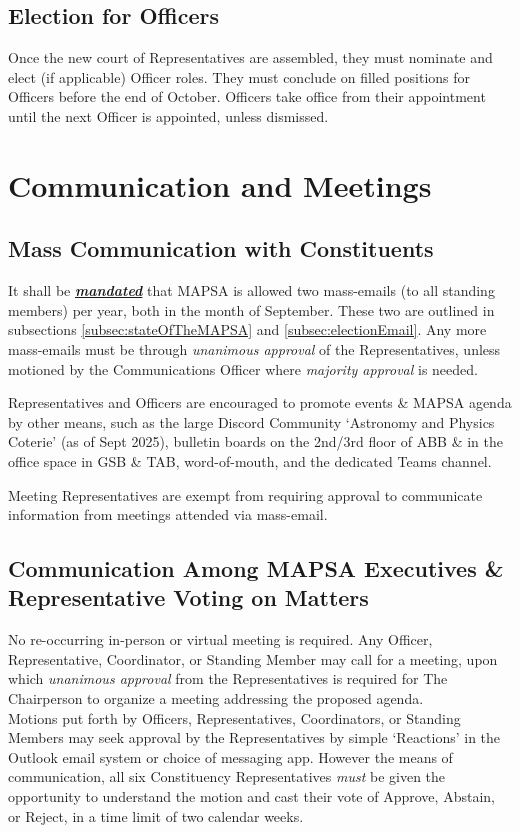 \documentclass[8pt]{article}
\begin{document}
	\subsection{Election for Officers}
	Once the new court of Representatives are assembled, they must nominate and elect (if applicable) Officer roles. They must conclude on filled positions for Officers before the end of October. Officers take office from their appointment until the next Officer is appointed, unless dismissed.
	
	\section{Communication and Meetings}
	\subsection{Mass Communication with Constituents}
	It shall be \textbf{\textit{\underline{mandated}}} that MAPSA is allowed two mass-emails (to all standing members) per year, both in the month of September. These two are outlined in subsections \ref{subsec:stateOfTheMAPSA} and \ref{subsec:electionEmail}. Any more mass-emails must be through \textit{unanimous approval} of the Representatives, unless motioned by the Communications Officer where \textit{majority approval} is needed.

	Representatives and Officers are encouraged to promote events \& MAPSA agenda by other means, such as the large Discord Community `Astronomy and Physics Coterie' (as of Sept 2025), bulletin boards on the 2nd/3rd floor of ABB \& in the office space in GSB \& TAB, word-of-mouth, and the dedicated Teams channel.
	
	Meeting Representatives are exempt from requiring approval to communicate information from meetings attended via mass-email.
	
	\subsection{Communication Among MAPSA Executives \& Representative Voting on Matters}
	No re-occurring in-person or virtual meeting is required. Any Officer, Representative, Coordinator, or Standing Member may call for a meeting, upon which \textit{unanimous approval} from the Representatives is required for The Chairperson to organize a meeting addressing the proposed agenda. \\
	Motions put forth by Officers, Representatives, Coordinators, or Standing Members may seek approval by the Representatives by simple `Reactions' in the Outlook email system or choice of messaging app. However the means of communication, all six Constituency Representatives \textit{must} be given the opportunity to understand the motion and cast their vote of Approve, Abstain, or Reject, in a time limit of two calendar weeks.
	
\end{document}

